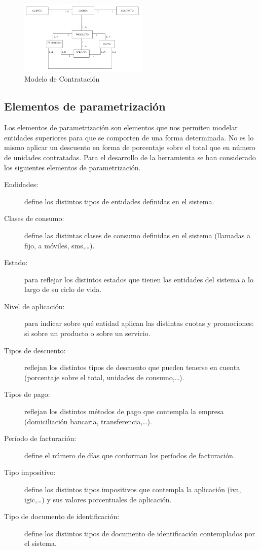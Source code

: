 \begin{figure}
  \centering
  \includegraphics[width=0.55\textwidth]{imaxes/instancia.png}
  \caption{Modelo de Contratación}
  \label{fig:contratacion-chap-analisis}
\end{figure}


\subsection{Elementos de parametrización}
\label{sub:parametrizacion-chap-analisis}
Los elementos de parametrización son elementos que nos permiten modelar entidades superiores para que se comporten de una forma determinada. No es lo mismo aplicar un descuento en forma de porcentaje sobre el total que en número de unidades contratadas. Para el desarrollo de la herramienta se han considerado los siguientes elementos de parametrización.
\begin{description}
\item[Endidades:] define los distintos tipos de entidades definidas en el sistema.
\item[Clases de consumo:] define las distintas clases de consumo definidas en el sistema (llamadas a fijo, a móviles, sms,\dots).
\item[Estado:] para reflejar los distintos estados que tienen las entidades del sistema a lo largo de su ciclo de vida.
\item[Nivel de aplicación:] para indicar sobre qué entidad aplican las distintas cuotas y promociones: si sobre un producto o sobre un servicio.
\item[Tipos de descuento:] reflejan los distintos tipos de descuento que pueden tenerse en cuenta (porcentaje sobre el total, unidades de consumo,\dots).
\item[Tipos de pago:] reflejan los distintos métodos de pago que contempla la empresa (domiciliación bancaria, transferencia,\dots).
\item[Período de facturación:] define el número de días que conforman los  períodos de facturación.
\item[Tipo impositivo:] define los distintos tipos impositivos que contempla la aplicación (iva, igic,\dots) y sus valores porcentuales de aplicación.
\item[Tipo de documento de identificación:] define los distintos tipos de documento de identificación contemplados por el sistema.
\end{description}




